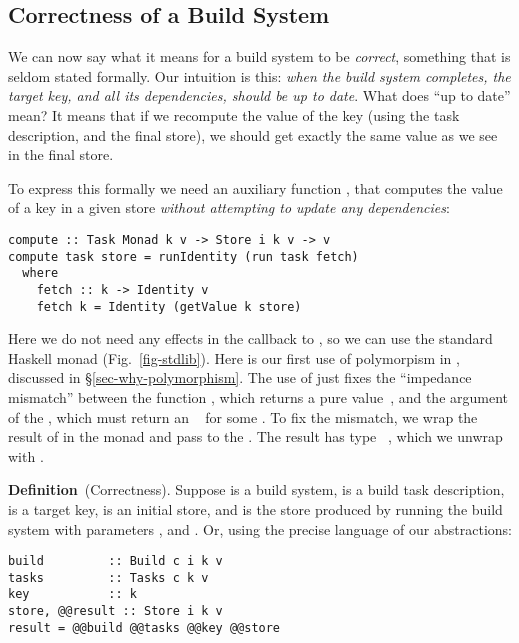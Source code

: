 \subsection{Correctness of a Build System}\label{sec-build-correctness}

We can now say what it means for a build system to be \emph{correct}, something
that is seldom stated formally. Our intuition is this: \emph{when the build
system completes, the target key, and all its dependencies, should be up to
date}. What does ``up to date'' mean? It means that if we recompute the value of
the key (using the task description, and the final store), we should get exactly
the same value as we see in the final store.

To express this formally we need an auxiliary function , that
computes the value of a key in a given store \emph{without attempting to update
any dependencies}:

\begin{verbatim}
compute :: Task Monad k v -> Store i k v -> v
compute task store = runIdentity (run task fetch)
  where
    fetch :: k -> Identity v
    fetch k = Identity (getValue k store)
\end{verbatim}

\noindent
Here we do not need any effects in the  callback to , so
we can use the standard Haskell  monad (Fig.~\ref{fig-stdlib}).
Here is our first use of polymorpism in , discussed in \S\ref{sec-why-polymorphism}.
The use of  just fixes the ``impedance mismatch'' between the
function , which returns a pure value~, and the 
argument of the , which must return an ~ for some .
To fix the mismatch, we wrap the result of  in the 
monad and pass to the . The result has type ~, which
we unwrap with .

\vspace{2mm}
\textbf{Definition}~(Correctness). Suppose  is a build system,
 is a build task description,  is a target key,  is
an initial store, and  is the store produced by running the build
system with parameters ,  and . Or, using the
precise language of our abstractions:

\begin{verbatim}
build         :: Build c i k v
tasks         :: Tasks c k v
key           :: k
store, @@result :: Store i k v
result = @@build @@tasks @@key @@store
\end{verbatim}

